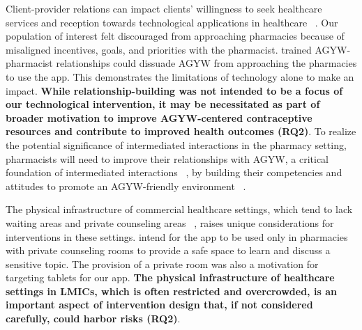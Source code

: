 Client-provider relations can impact clients’ willingness to seek healthcare services and reception towards technological applications in healthcare ~\cite{10.1145/3613904.3642245}. Our population of interest felt discouraged from approaching pharmacies because of misaligned incentives, goals, and priorities with the pharmacist.  trained AGYW-pharmacist relationships could  dissuade AGYW from approaching the pharmacies to use the app. This  demonstrates the limitations of technology alone to make an impact. \textbf{While relationship-building was not intended to be a focus of our technological intervention, it may be necessitated as part of broader motivation to improve AGYW-centered contraceptive resources and contribute to improved health outcomes (RQ2)}. To realize the potential significance of intermediated interactions in the pharmacy setting, pharmacists will need to improve their relationships with AGYW, a critical foundation of intermediated interactions ~\cite{10.1145/2369220.2369258}, by building their competencies and attitudes to promote an AGYW-friendly environment ~\cite{chandra2014contraception}. 

The physical infrastructure of commercial healthcare settings, which tend to lack waiting areas and private counseling areas ~\cite{de2018adolescent}, raises unique considerations for interventions in these settings.  intend for the  app to be used only in pharmacies with private counseling rooms to provide a safe space to learn and discuss a sensitive topic. The provision of a private room was also a motivation for targeting tablets for our app. \textbf{The physical infrastructure of healthcare settings in LMICs, which is often restricted and overcrowded, is an important aspect of intervention design that, if not considered carefully, could harbor risks (RQ2)}.%

